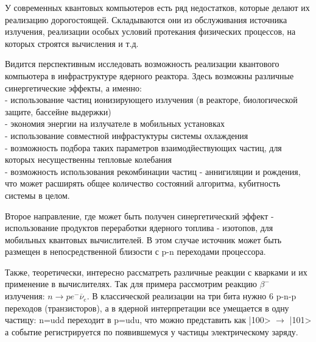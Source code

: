 \documentclass[11pt]{article}
\begin{document}
У современных квантовых компьютеров есть ряд недостатков, которые делают их реализацию дорогостоящей. Складываются они из обслуживания источника излучения, реализации особых условий протекания физических процессов, на которых строятся вычисления и т.д. 

Видится перспективным исследовать возможность реализации квантового компьютера в инфраструктуре ядерного реактора. Здесь возможны различные синергетические эффекты, а именно: \\
- использование частиц ионизирующего излучения (в реакторе, биологической защите, бассейне выдержки)\\
- экономия энергии на излучателе в мобильных установках\\
- использование совместной инфрастуктуры системы охлаждения\\
- возможность подбора таких параметров взаимодйествующих частиц, для которых несущественны тепловые колебания\\
- возможность использования рекомбинации частиц - аннигиляции и рождения, что может расширять общее количество состояний алгоритма, кубитность системы в целом.

Второе направление, где может быть получен синергетический эффект - использование продуктов переработки ядерного топлива - изотопов, для мобильных квантовых вычислителей. В этом случае источник может быть размещен в непосредственной близости с p-n переходами процессора.

Также, теоретически, интересно рассматреть различные реакции с кварками и их применение в вычислителях. Так для примера рассмотрим реакцию $\beta^{-}$ излучения: $n \rightarrow pe^{-} \overline \nu_e $. В классической реализации на три бита нужно 6 p-n-p переходов (транзисторов), а в ядерной интерпретации все умещается в одну частицу: n=udd переходит в p=udu, что можно представить как |100> $\rightarrow $ |101> а событие регистрируется по появившемуся у частицы электрическому заряду. 
\end{document}
